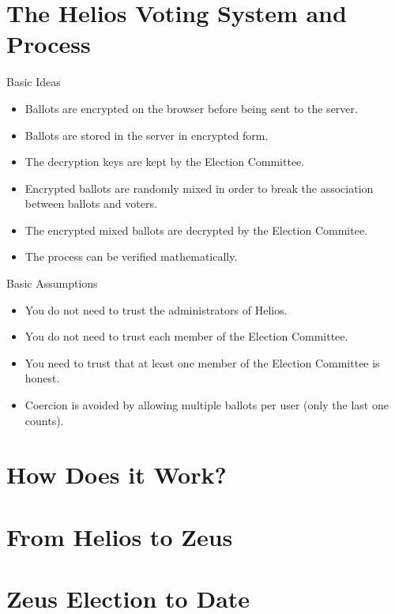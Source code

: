 \documentclass[utf8]{beamer}
\begin{document}
\section{The Helios Voting System and Process}

\begin{frame}{Basic Ideas}

\begin{itemize}
\item Ballots are encrypted on the browser before being sent to the
  server.
\item Ballots are stored in the server in encrypted form.
\item The decryption keys are kept by the Election Committee.
\item Encrypted ballots are randomly mixed in order to break the
  association between ballots and voters.
\item The encrypted mixed ballots are decrypted by the Election
  Commitee.
\item The process can be verified mathematically.
\end{itemize}

\end{frame}

\begin{frame}{Basic Assumptions}

\begin{itemize}
\item You do not need to trust the administrators of Helios.
\item You do not need to trust each member of the Election Committee.
\item You need to trust that at least one member of the Election
  Committee is honest.
\item Coercion is avoided by allowing multiple ballots per user (only
  the last one counts).
\end{itemize}

\section{How Does it Work?}

\section{From Helios to Zeus}

\section{Zeus Election to Date}

\end{frame}
\end{document}
